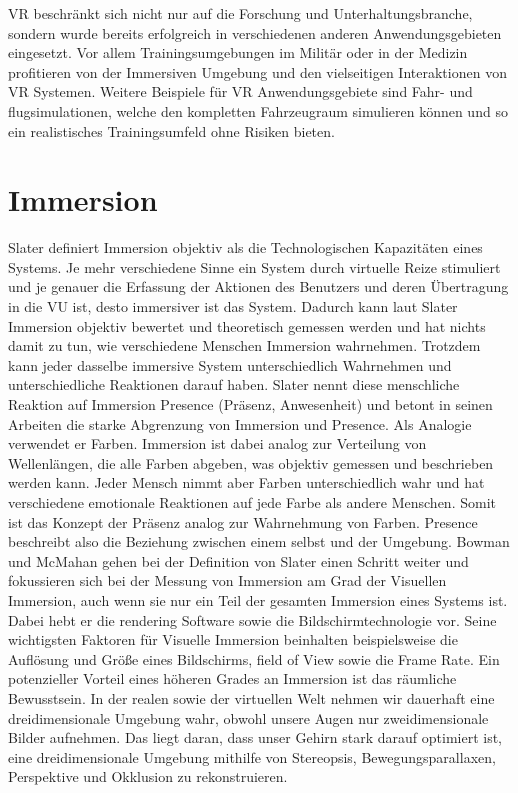 VR beschränkt sich nicht nur auf die Forschung und Unterhaltungsbranche, sondern wurde bereits erfolgreich in verschiedenen anderen Anwendungsgebieten eingesetzt. Vor allem Trainingsumgebungen im Militär oder in der Medizin profitieren von der Immersiven Umgebung und den vielseitigen Interaktionen von VR Systemen. Weitere Beispiele für VR Anwendungsgebiete sind Fahr- und flugsimulationen, welche den kompletten Fahrzeugraum simulieren können und so ein realistisches Trainingsumfeld ohne Risiken bieten.\cite{Ragan2010}
 

\section{Immersion}
Slater\cite{Slater2003}\cite{Slater1999} definiert Immersion objektiv als die Technologischen Kapazitäten eines Systems. Je mehr verschiedene Sinne ein System durch virtuelle Reize stimuliert und je genauer die Erfassung der Aktionen des Benutzers und deren Übertragung in die VU ist, desto immersiver ist das System. Dadurch kann laut Slater Immersion objektiv bewertet und theoretisch gemessen werden und hat nichts damit zu tun, wie verschiedene Menschen Immersion wahrnehmen. Trotzdem kann jeder dasselbe immersive System unterschiedlich Wahrnehmen und unterschiedliche Reaktionen darauf haben. Slater nennt diese menschliche Reaktion auf Immersion Presence (Präsenz, Anwesenheit) und betont in seinen Arbeiten die starke Abgrenzung von Immersion und Presence. Als Analogie verwendet er Farben. Immersion ist dabei analog zur Verteilung von Wellenlängen, die alle Farben abgeben, was objektiv gemessen und beschrieben werden kann. Jeder Mensch nimmt aber Farben unterschiedlich wahr und hat verschiedene emotionale Reaktionen auf jede Farbe als andere Menschen. Somit ist das Konzept der Präsenz analog zur Wahrnehmung von Farben. Presence beschreibt also die Beziehung zwischen einem selbst und der Umgebung.
Bowman und McMahan\cite{Bowman2007} gehen bei der Definition von Slater einen Schritt weiter und fokussieren sich bei der Messung von Immersion am Grad der Visuellen Immersion, auch wenn sie nur ein Teil der gesamten Immersion eines Systems ist. Dabei hebt er die rendering Software sowie die Bildschirmtechnologie vor. Seine wichtigsten Faktoren für Visuelle Immersion beinhalten beispielsweise die Auflösung und Größe eines Bildschirms, field of View sowie die Frame Rate.
Ein potenzieller Vorteil eines höheren Grades an Immersion ist das räumliche Bewusstsein. In der realen sowie der virtuellen Welt nehmen wir dauerhaft eine dreidimensionale Umgebung wahr, obwohl unsere Augen nur zweidimensionale Bilder aufnehmen. Das liegt daran, dass unser Gehirn stark darauf optimiert ist, eine dreidimensionale Umgebung mithilfe von Stereopsis, Bewegungsparallaxen, Perspektive und Okklusion zu rekonstruieren. 
